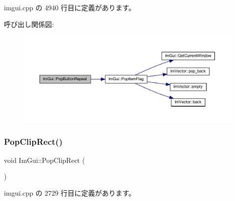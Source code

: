  imgui.\+cpp の 4940 行目に定義があります。

呼び出し関係図\+:\nopagebreak
\begin{figure}[H]
\begin{center}
\leavevmode
\includegraphics[width=350pt]{namespace_im_gui_a0f883e8507be797ca8ba1448d2b9dbb0_cgraph}
\end{center}
\end{figure}
\mbox{\label{namespace_im_gui_aef1c8a6e5a3c70cb10d03d2a2a66dfd8}} 
\subsubsection{\texorpdfstring{Pop\+Clip\+Rect()}{PopClipRect()}}
{\footnotesize\ttfamily void Im\+Gui\+::\+Pop\+Clip\+Rect (\begin{DoxyParamCaption}{ }\end{DoxyParamCaption})}



 imgui.\+cpp の 2729 行目に定義があります。

